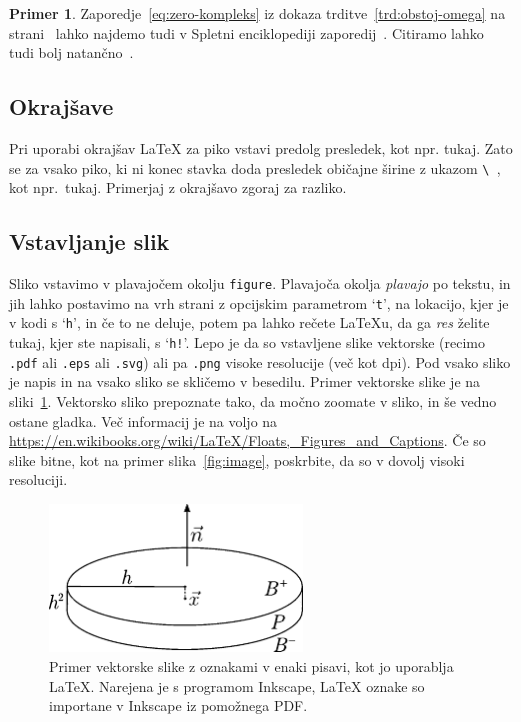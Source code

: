 \documentclass[12pt,a4paper,twoside]{article}
\theoremstyle{definition} %
\newtheorem{primer}[definicija]{Primer}
\theoremstyle{plain} %
\numberwithin{equation}{section}  %
\begin{document}
\begin{primer}
  Zaporedje~\eqref{eq:zero-kompleks} iz dokaza trditve~\ref{trd:obstoj-omega} na
  strani~\pageref{trd:obstoj-omega} lahko najdemo tudi v Spletni enciklopediji zaporedij~\cite{oeis}.
  Citiramo lahko tudi bolj natančno~\cite[trditev 2.1, str.\ 23]{lebedev2009introduction}.
\end{primer}

\subsection{Okrajšave}
Pri uporabi okrajšav \LaTeX{} za piko vstavi predolg presledek, kot npr. tukaj. Zato se za vsako
piko, ki ni konec stavka doda presledek običajne širine z ukazom \verb*|\ |, kot npr.\ tukaj.
Primerjaj z okrajšavo zgoraj za razliko.

\subsection{Vstavljanje slik}
Sliko vstavimo v plavajočem okolju \texttt{figure}. Plavajoča okolja \emph{plavajo} po tekstu, in
jih lahko postavimo na vrh strani z opcijskim parametrom `\texttt{t}', na lokacijo, kjer je v kodi s
`\texttt{h}', in če to ne deluje, potem pa lahko rečete \LaTeX u, da ga \emph{res} želite tukaj,
kjer ste napisali, s `\texttt{h!}'. Lepo je da so vstavljene slike vektorske (recimo \texttt{.pdf}
ali \texttt{.eps} ali \texttt{.svg}) ali pa \texttt{.png} visoke resolucije (več kot
\unit[300]{dpi}).  Pod vsako sliko je napis in na vsako sliko se skličemo v besedilu. Primer
vektorske slike je na sliki~\ref{fig:sample}. Vektorsko sliko prepoznate tako, da močno
zoomate v sliko, in še vedno ostane gladka. Več informacij je na voljo na
\url{https://en.wikibooks.org/wiki/LaTeX/Floats,_Figures_and_Captions}. Če so slike bitne, kot na
primer slika~\ref{fig:image}, poskrbite, da so v dovolj visoki resoluciji.

\begin{figure}[h]
  \centering
  \includegraphics[width=0.6\textwidth]{images/sample.pdf}
  \caption[Primer vektorske slike.]{Primer vektorske slike z oznakami v enaki pisavi, kot jo
     uporablja \LaTeX{}.  Narejena je s programom Inkscape, \LaTeX{} oznake so importane v
     Inkscape iz pomožnega PDF.}
  \label{fig:sample}
\end{figure}
\end{document}
